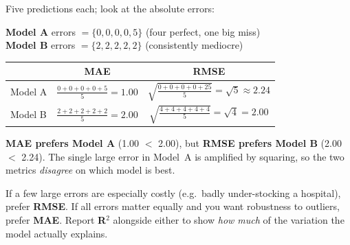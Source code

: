 \documentclass[11pt,a4paper]{article}
\begin{document}
\begin{definitionbox}
Five predictions each; look at the absolute errors:

\smallskip
\textbf{Model A} errors $= \{0,0,0,0,5\}$ \quad(four perfect, one big miss)\\
\textbf{Model B} errors $= \{2,2,2,2,2\}$ \quad(consistently mediocre)

\smallskip
\begin{tabular}{@{}lcc@{}}
\toprule
\rowcolor{primary!15}
& \textbf{MAE} & \textbf{RMSE} \\
\midrule
Model A & $\tfrac{0+0+0+0+5}{5}=\mathbf{1.00}$ & $\sqrt{\tfrac{0+0+0+0+25}{5}}=\sqrt{5}\approx\mathbf{2.24}$ \\
Model B & $\tfrac{2+2+2+2+2}{5}=\mathbf{2.00}$ & $\sqrt{\tfrac{4+4+4+4+4}{5}}=\sqrt{4}=\mathbf{2.00}$ \\
\bottomrule
\end{tabular}

\smallskip
\textbf{MAE prefers Model A} (1.00 $<$ 2.00), but \textbf{RMSE prefers Model B} (2.00 $<$ 2.24). The single large error in Model~A is amplified by squaring, so the two metrics \emph{disagree} on which model is best.
\end{definitionbox}

\begin{conceptbox}
If a few large errors are especially costly (e.g.\ badly under-stocking a hospital), prefer \textbf{RMSE}. If all errors matter equally and you want robustness to outliers, prefer \textbf{MAE}. Report \textbf{R$^2$} alongside either to show \emph{how much} of the variation the model actually explains.
\end{conceptbox}
\end{document}
